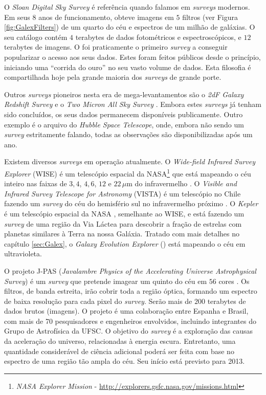 O {\em Sloan Digital Sky Survey} \citep[\SDSS; ][]{York2000} é referência quando
falamos em {\em surveys} modernos. Em seus $8$ anos de funcionamento, obteve
imagens em $5$ filtros (ver Figura \ref{fig:GalexFilters}) de um quarto do céu e
espectros de um milhão de galáxias. O seu catálogo contém $4$ terabytes de dados
fotométricos e espectroscópicos, e $12$ terabytes de imagens. O \SDSS foi
praticamente o primeiro {\em survey} a conseguir popularizar o acesso aos seus
dados. Estes foram feitos públicos desde o princípio, iniciando uma ``corrida do
ouro'' no seu vasto volume de dados. Esta filosofia é compartilhada hoje pela
grande maioria dos {\em surveys} de grande porte.

Outros {\em surveys} pioneiros nesta era de mega-levantamentos são o
{\em 2dF Galaxy Redshift Survey} \citep[2dFGRS;][]{Colless1999} e o {\em Two
Micron All Sky Survey} \citep[2MASS;][]{Skrutskie2006}. Embora estes {\em
surveys} já tenham sido concluídos, os seus dados permanecem disponíveis
publicamente. Outro exemplo é o arquivo do {\em Hubble Space Telescope}, onde,
embora não sendo um {\em survey} estritamente falando, todas as observações são
disponibilizadas após um ano.

Existem diversos {\em surveys} em operação atualmente. O {\em Wide-field
Infrared Survey Explorer} (WISE) é um telescópio espacial da NASA\footnote{{\em
NASA Explorer Mission} - \url{http://explorers.gsfc.nasa.gov/missions.html}} que
está mapeando o céu inteiro nas faixas de $3,4$, $4,6$, $12$ e
$22\,\mu\mathrm{m}$ do infravermelho \citep{Wright2010}. O {\em Visible and
Infrared Survey Telescope for Astronomy} (VISTA) é um telescópio no Chile
fazendo um {\em survey} do céu do hemisfério sul no infravermelho próximo
\citep{Born2010}. O {\em Kepler} é um telescópio espacial da NASA
\citep{Borucki2010}, semelhante ao WISE, e está fazendo um {\em survey} de uma
região da Via Láctea para descobrir a fração de estrelas com planetas similares
à Terra na nossa Galáxia. Tratado com mais detalhes no capítulo \ref{sec:Galex},
o {\em Galaxy Evolution Explorer} (\galex) está mapeando o céu em ultravioleta.

O projeto J-PAS ({\em Javalambre Physics of the Accelerating Universe
Astrophysical Survey}) é um {\em survey} que pretende imagear um quinto do céu
em $56$ cores \citep{Benitez2009}. Os filtros, de banda estreita, irão cobrir
toda a região óptica, formando um espectro de baixa resolução para cada pixel do {\em
survey}. Serão mais de $200$ terabytes de dados brutos (imagens). O projeto é
uma colaboração entre Espanha e Brasil, com mais de 70 pesquisadores e engenheiros
envolvidos, incluindo integrantes do Grupo de Astrofísica da UFSC. O objetivo do
{\em survey} é a exploração das causas da aceleração do universo, relacionadas à
energia escura. Entretanto, uma quantidade considerável de ciência adicional
poderá ser feita com base no espectro de uma região tão ampla do céu. Seu início
está previsto para 2013.

